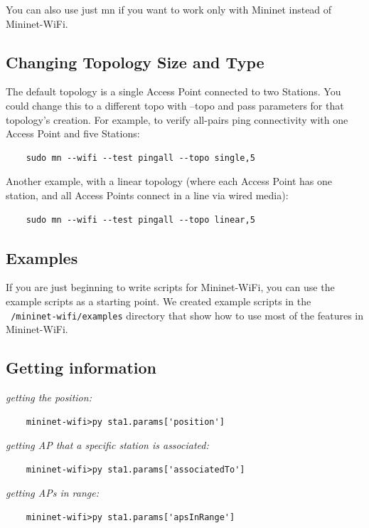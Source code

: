 \noindent You can also use just mn if you want to work only with Mininet instead of Mininet-WiFi.

\subsection{Changing Topology Size and Type}
The default topology is a single Access Point connected to two Stations. You could change this to a different topo with --topo and pass parameters for that topology’s creation. For example, to verify all-pairs ping connectivity with one Access Point and five Stations:
\begin{verbatim}
    sudo mn --wifi --test pingall --topo single,5
\end{verbatim}

\noindent Another example, with a linear topology (where each Access Point has one station, and all Access Points connect in a line via wired media):
\begin{verbatim}
    sudo mn --wifi --test pingall --topo linear,5
\end{verbatim}

\subsection{Examples}
If you are just beginning to write scripts for Mininet-WiFi, you can use the example scripts as a starting point. We created example scripts in the \texttt{~/mininet-wifi/examples} directory that show how to use most of the features in Mininet-WiFi.

\subsection{Getting information}

\noindent \textit{getting the position:}
\begin{verbatim}
    mininet-wifi>py sta1.params['position']
\end{verbatim}

\noindent \textit{getting AP that a specific station is associated:}
\begin{verbatim}
    mininet-wifi>py sta1.params['associatedTo']
\end{verbatim}

\noindent \textit{getting APs in range:}
\begin{verbatim}
    mininet-wifi>py sta1.params['apsInRange']
\end{verbatim}

